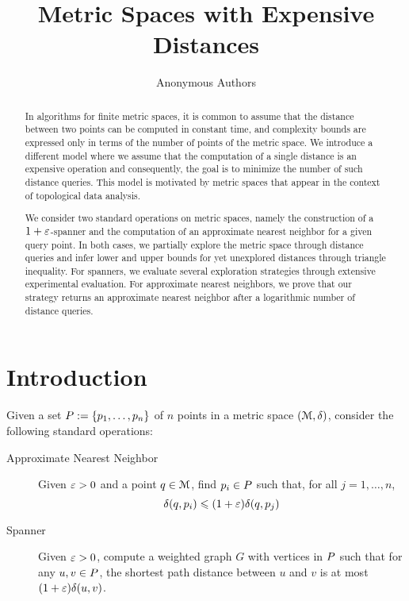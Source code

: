 \documentclass[a4paper,UKenglish,cleveref, autoref]{lipics-v2019}
\title{Metric Spaces with Expensive Distances}
\author{Anonymous Authors}{Anon}{}{}{}
\begin{document}
\maketitle

\begin{abstract}
In algorithms for finite metric spaces, it is common
to assume that the distance between two points
can be computed in constant time, and complexity
bounds are expressed only in terms of the number
of points of the metric space.
We introduce a different model where we assume
that the computation of a single distance is
an expensive operation and consequently, the goal is
to minimize the number of such distance queries.
This model is motivated by metric spaces
that appear in the context of topological data analysis.

We consider two standard operations on metric spaces,
namely the construction of a $1+\varepsilon$-spanner
and the computation of an approximate nearest
neighbor for a given query point.
In both cases, we partially explore the metric space
through distance queries and infer lower and upper bounds
for yet unexplored distances through triangle inequality.
For spanners, we evaluate several exploration strategies
through extensive experimental evaluation.
For approximate nearest neighbors, we prove that our
strategy returns an approximate nearest neighbor
after a logarithmic number of distance queries.
\end{abstract}

\section{Introduction}

Given a set $P:=\{p_1,\ldots,p_n\}$ of $n$ points
in a metric space $(\mathcal{M},\delta)$, 
consider the following standard operations:

\begin{description}
\item[Approximate Nearest Neighbor] Given $\varepsilon>0$ and a point $q\in\mathcal{M}$,
find $p_i\in P$ such that, for all $j=1,\ldots,n$,
\[\delta(q,p_i)\leqslant(1+\varepsilon)\delta(q,p_j)\]

\item[Spanner] Given $\varepsilon>0$, compute a weighted graph $G$ with vertices in $P$
such that for any $u,v\in P$, the shortest path distance between $u$ and $v$
is at most $(1+\varepsilon)\delta(u,v)$.
\end{description}
\end{document}
